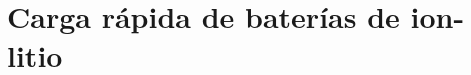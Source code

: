 \documentclass[12pt,spanish,a4paper,twoside]{book}
\begin{document}
\part{Carga rápida de baterías de ion-litio}







% 

% 

% 

% 

%
%
%


% 



\end{document}
